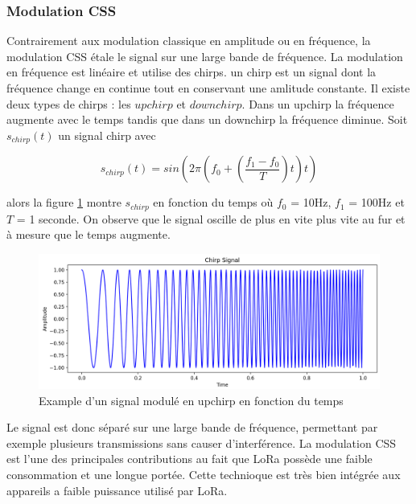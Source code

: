\subsubsection{Modulation CSS}\label{css}

Contrairement aux modulation classique en amplitude ou en fréquence, la modulation CSS étale le signal sur une large bande de fréquence. La modulation en fréquence est linéaire et utilise des chirps. un chirp est un signal dont la fréquence change en continue tout en conservant une amlitude constante. Il existe deux types de chirps : les $upchirp$ et $downchirp$.
Dans un upchirp la fréquence augmente avec le temps tandis que dans un downchirp la fréquence diminue. Soit $s_{chirp}(t)$ un signal chirp avec

\begin{equation}\label{eq3}
s_{chirp}(t) = sin(2\pi(f_0 + (\frac{f_1 - f_0}{T})t)t)
\end{equation}

alors la figure \ref{term5} montre $s_{chirp}$ en fonction du temps où $f_0$ = 10Hz, $f_1$ = 100Hz et $T$ = 1 seconde. On observe que le signal oscille de plus en vite plus vite au fur et à mesure que le temps augmente.

\begin{figure}[h]
\centering

\includegraphics[scale=0.18]{images/CSSupchirp.png}
\caption{Example d'un signal modulé en upchirp en fonction du temps}\label{term5}
\end{figure}

\vspace{0.1cm}

Le signal est donc séparé sur une large bande de fréquence, permettant par exemple plusieurs transmissions sans causer d'interférence.
La modulation CSS est l'une des principales contributions au fait que LoRa possède une faible consommation et une longue portée. Cette technioque est très bien intégrée aux appareils a faible puissance utilisé par LoRa.


